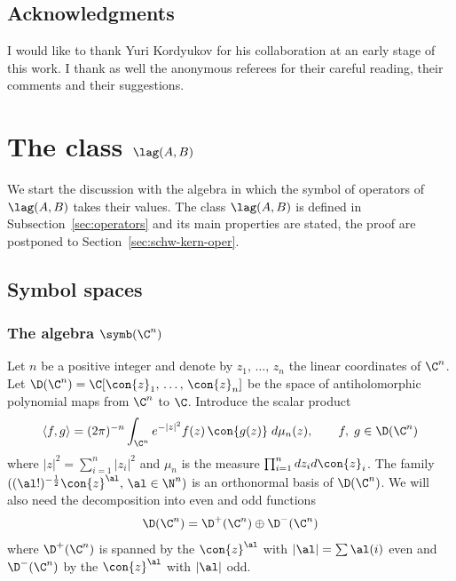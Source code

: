 \subsection*{Acknowledgments}
I would like to thank Yuri Kordyukov for his collaboration at an early stage of this work. I thank as well the anonymous referees for their careful reading, their comments and their suggestions.




\section{The class \texorpdfstring{$\lag (A,B)$}{L(A,B)}} \label{sec:class-lag-pres}

We start the discussion with the algebra in which the symbol of operators of $\lag (A, B)$ takes their values. The class $\lag (A,B)$ is defined in Subsection~\ref{sec:operators}  and its main properties are stated, the proof are postponed to Section~\ref{sec:schw-kern-oper}. 

\subsection{Symbol spaces} \label{sec:symbol-spaces}

\subsubsection{The algebra $\symb (\C^n)$}
Let $n$ be a positive integer and denote by $z_1,\, \ldots,\, z_n$ the linear coordinates of $\C^n$. Let $\D (\C^n)= \C [\con{z}_1, \,\ldots,\, \con{z}_n]$ be the space of antiholomorphic polynomial maps from $\C^n$ to $\C$. Introduce the scalar product
\begin{gather}\label{eq:scal_product_bargm}
\langle f, g \rangle = (2\pi)^{-n}\int_{\C^n} e^{-|z|^2} f (z)\, \con{g (z)} \; d \mu_n (z), \qquad f,\; g \in \D (\C^n)
\end{gather}
where $|z|^2 = \sum_{i=1}^n |z_i|^2$ and $ \mu_n $ is the measure $\prod_{i=1}^n dz_i d\con{z}_i$. The family $((\al !)^{-\frac{1}{2}} \con{z}^\al, \, \al \in
\N^n)$ is an orthonormal basis of $\D (\C^n)$. We will also need the decomposition into even and odd functions
\begin{gather}\label{eq:paire_impaire}
\D (\C^n) = \D^+ (\C^n) \oplus \D ^{-} (\C^n)
\end{gather}
where $ \D^+ (\C^n) $ is spanned by the $\con{z}^\al$ with $|\al| = \sum \al(i)$ even and $\D ^{-} (\C^n) $ by the $\con{z}^\al$ with $|\al|$ odd.


